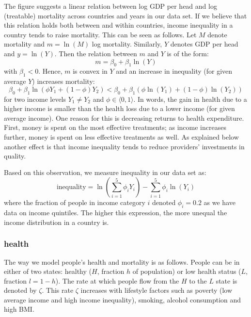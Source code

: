 \documentclass{article}
\begin{document}
The figure suggests a linear relation between log GDP per head and log (treatable) mortality across countries and years in our data set. If we believe that this relation holds both between and within countries, income inequality in a country tends to raise mortality. This can be seen as follows. Let \(M\) denote mortality and \(m=\ln(M)\) log mortality. Similarly, \(Y\) denotes GDP per head and \(y=\ln(Y)\). Then the relation between \(m\) and \(Y\) is of the form:
\begin{equation}
\label{eq:2}
m = \beta_0 + \beta_1 \ln(Y)
\end{equation}
with \(\beta_1 <0\). Hence, \(m\) is convex in \(Y\) and an increase in inequality (for given average \(Y\)) increases mortality:
\begin{equation}
\label{eq:3}
\beta_0 + \beta_1 \ln(\phi Y_1 + (1-\phi) Y_2) < \beta_0 + \beta_1 (\phi \ln(Y_1) + (1-\phi) \ln(Y_2))
\end{equation}
for two income levels \(Y_1 \neq Y_2\) and \(\phi \in \langle 0,1 \rangle\). In words, the gain in health due to a higher income is smaller than the health loss due to a lower income (for given average income). One reason for this is decreasing returns to health expenditure. First, money is spent on the most effective treatments; as income increases further, money is spent on less effective treatments as well. As explained below another effect is that income inequality tends to reduce providers' investments in quality.

Based on this observation, we measure inequality in our data set as:
\begin{equation}
\label{eq:19}
\text{inequality} = \ln\left(\sum_{i=1}^5 \phi_i Y_i \right) - \sum_{i=1}^5 \phi_i \ln(Y_i)
\end{equation}
where the fraction of people in income category \(i\) denoted \(\phi_i = 0.2\) as we have data on income quintiles. The higher this expression, the more unequal the income distribution in a country is.

\subsubsection{health}
\label{sec:orge53ea97}

The way we model people's health and mortality is as follows. People can be in either of two states: healthy (\(H\), fraction \(h\) of population) or low health status (\(L\), fraction \(l=1-h\)). The rate at which people flow from the \(H\) to the \(L\) state is denoted by \(\zeta\). This rate \(\zeta\) increases with lifestyle factors such as poverty (low average income and high income inequality), smoking, alcohol consumption and high BMI.
\end{document}
